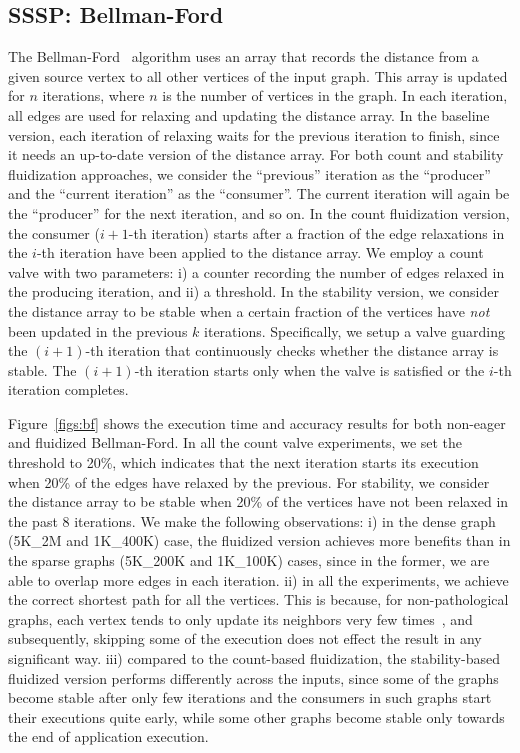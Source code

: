 \subsection{SSSP: Bellman-Ford}
The Bellman-Ford~\cite{bellman-ford} algorithm uses an array that records the distance from a given source vertex to all other vertices of the input graph. This array is updated for $n$ iterations, where $n$ is the number of vertices in the graph. In each iteration, all edges are used for relaxing and updating the distance array. In the baseline version, each iteration of relaxing waits for the previous iteration to finish, since it needs an up-to-date version of the distance array. For both count and stability fluidization approaches, we consider the ``previous'' iteration as the ``producer'' and the ``current iteration'' as the ``consumer''. The current iteration will again be the ``producer'' for the next iteration, and so on. In the count fluidization version, the consumer ($i+1$-th iteration) starts after a fraction of the edge relaxations in the $i$-th iteration have been applied to the distance array. We employ a count valve with two parameters: i) a counter recording the number of edges relaxed in the producing iteration, and ii) a threshold. In the stability version, we consider the distance array to be stable when a certain fraction of the vertices have {\it not} been updated in the previous $k$ iterations. Specifically, we setup a valve guarding the $(i+1)$-th iteration that continuously checks whether the distance array is stable. The $(i+1)$-th iteration starts only when the valve is satisfied or the $i$-th iteration completes.

Figure~\ref{figs:bf} shows the execution time and accuracy results for both non-eager and fluidized Bellman-Ford. In all the count valve experiments, we set the threshold to 20\%, which indicates that the next iteration starts its execution when 20\% of the edges have relaxed by the previous. For stability, we consider the distance array to be stable when 20\% of the vertices have not been relaxed in the past 8 iterations. We make the following observations: i) in the dense graph (5K\_2M and 1K\_400K) case, the fluidized version achieves more benefits than in the sparse graphs (5K\_200K and 1K\_100K) cases, since in the former, we are able to overlap more edges in each iteration. ii) in all the experiments, we achieve the correct shortest path for all the vertices. This is because, for non-pathological graphs, each vertex tends to only update its neighbors very few times~\cite{fanding1994faster}, and subsequently, skipping some of the execution does not effect the result in any significant way. iii) compared to the count-based fluidization, the stability-based fluidized version performs differently across the inputs, since %
some of the graphs become stable after only few iterations and the consumers in such graphs start their executions quite early, while some other graphs become stable only towards the end of application execution.  




